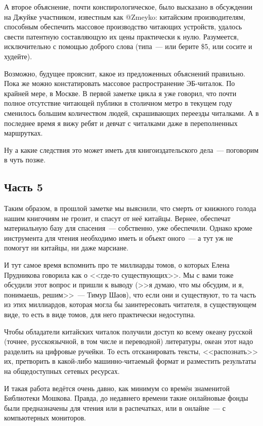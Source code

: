 А второе объяснение, почти конспирологическое, было высказано в обсуждении на Джуйке участником, известным как @Zmeyko: китайским производителям, способным обеспечить массовое производство читающих устройств, удалось свести патентную составляющую их цены практически к нулю. Разумеется, исключительно с помощью доброго слова (типа~--- или берите \$5, или сосите и худейте).

Возможно, будущее прояснит, какое из предложенных объяснений правильно. Пока же можно констатировать массовое распространение ЭБ-читалок. По крайней мере, в Москве. В первой заметке цикла я уже говорил, что почти полное отсутствие читающей публики в столичном метро в текущем году сменилось большим количеством людей, скрашивающих переезды читалками. А в последнее время я вижу ребят и девчат с читалками даже в переполненных маршрутках.

Ну а какие следствия это может иметь для книгоиздательского дела~--- поговорим в чуть позже.

\subsection{Часть 5}
Таким образом, в прошлой заметке мы выяснили, что смерть от книжного голода нашим книгочиям не грозит, и спасут от неё китайцы. Вернее, обеспечат материальную базу для спасения~--- собственно, уже обеспечили. Однако кроме инструмента для чтения необходимо иметь и объект оного~--- а тут уж не помогут ни китайцы, ни даже марсиане.

И тут самое время вспомнить про те миллиарды томов, о которых Елена Прудникова говорила как о <<где-то существующих>>. Мы с вами тоже обсудили этот вопрос и пришли к выводу (>>я думаю, что мы обсудим, и я, понимаешь, решим>>~--- Тимур Шаов), что если они и существуют, то та часть из этих миллиардов, которая могла бы заинтересовать читателя, в существующем виде, то есть в виде томов, для него практически недоступна.

Чтобы обладатели китайских читалок получили доступ ко всему океану русской (точнее, русскоязычной, в том числе и переводной) литературы, океан этот надо разделить на цифровые ручейки. То есть отсканировать тексты, <<распознать>> их, претворить в какой-либо машинно-читаемый формат и разместить результаты на общедоступных сетевых ресурсах.

И такая работа ведётся очень давно, как минимум со времён знаменитой Библиотеки Мошкова. Правда, до недавнего времени такие онлайновые фонды были предназначены для чтения или в распечатках, или в онлайне~--- с компьютерных мониторов.

